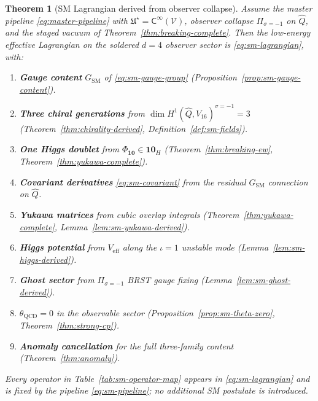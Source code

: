 \documentclass[11pt]{article}
\theoremstyle{plain}
\newtheorem{theorem}{Theorem}[section]
\theoremstyle{definition}
\theoremstyle{remark}
\numberwithin{equation}{section}
\newcommand{\Void}{\mathcal{V}}
\newcommand{\Climb}{\mathsf{C}}
\begin{document}
\begin{theorem}[SM Lagrangian derived from observer collapse]
\label{thm:sm-lagrangian-derived}
Assume the master pipeline \eqref{eq:master-pipeline} with
$\mathfrak{U}^\star=\Climb^\infty(\Void)$, observer collapse
$\Pi_{\sigma=-1}$ on $\hat Q$, and the staged vacuum of
Theorem~\ref{thm:breaking-complete}. Then the low-energy effective Lagrangian
on the soldered $d=4$ observer sector is \eqref{eq:sm-lagrangian}, with:
\begin{enumerate}[label=\textbf{(\roman*)},leftmargin=*]
  \item \textbf{Gauge content} $G_{\mathrm{SM}}$ of
    \eqref{eq:sm-gauge-group} (Proposition~\ref{prop:sm-gauge-content}).
  \item \textbf{Three chiral generations} from
    $\dim H^1(\hat Q,V_{16})^{\sigma=-1}=3$
    (Theorem~\ref{thm:chirality-derived}, Definition~\ref{def:sm-fields}).
  \item \textbf{One Higgs doublet} from $\Phi_{\mathbf{10}}\in\mathbf{10}_H$
    (Theorem~\ref{thm:breaking-ew}, Theorem~\ref{thm:yukawa-complete}).
  \item \textbf{Covariant derivatives} \eqref{eq:sm-covariant} from the
    residual $G_{\mathrm{SM}}$ connection on $\hat Q$.
  \item \textbf{Yukawa matrices} from cubic overlap integrals
    (Theorem~\ref{thm:yukawa-complete}, Lemma~\ref{lem:sm-yukawa-derived}).
  \item \textbf{Higgs potential} from $V_{\mathrm{eff}}$ along the
    $\iota=1$ unstable mode (Lemma~\ref{lem:sm-higgs-derived}).
  \item \textbf{Ghost sector} from $\Pi_{\sigma=-1}$ BRST gauge fixing
    (Lemma~\ref{lem:sm-ghost-derived}).
  \item \textbf{$\theta_{\mathrm{QCD}}=0$} in the observable sector
    (Proposition~\ref{prop:sm-theta-zero}, Theorem~\ref{thm:strong-cp}).
  \item \textbf{Anomaly cancellation} for the full three-family content
    (Theorem~\ref{thm:anomaly}).
\end{enumerate}
Every operator in Table~\ref{tab:sm-operator-map} appears in
\eqref{eq:sm-lagrangian} and is fixed by the pipeline
\eqref{eq:sm-pipeline}; no additional SM postulate is introduced.
\end{theorem}
\end{document}
